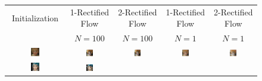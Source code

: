\begin{figure}[h]
\centering
\begin{tabular}{ccccc}
     Initialization & 1-Rectified Flow & 2-Rectified Flow & 1-Rectified Flow  & 2-Rectified Flow\\
     & $N=100$ & $N=100$ & $N=1$  & $N=1$\\
     \includegraphics[width=0.16\textwidth]{arxiv_figures/translation_nfe/image_1_1.png} & 
     \includegraphics[width=0.16\textwidth]{arxiv_figures/translation_nfe/image_1_2.png} &
     \includegraphics[width=0.16\textwidth]{arxiv_figures/translation_nfe/image_1_3.png} &
     \includegraphics[width=0.16\textwidth]{arxiv_figures/translation_nfe/image_1_4.png} &
     \includegraphics[width=0.16\textwidth]{arxiv_figures/translation_nfe/image_1_5.png}\\
     \includegraphics[width=0.16\textwidth]{arxiv_figures/translation_nfe/image_2_1.png} & 
     \includegraphics[width=0.16\textwidth]{arxiv_figures/translation_nfe/image_2_2.png} &

\end{tabular}
\end{figure}
